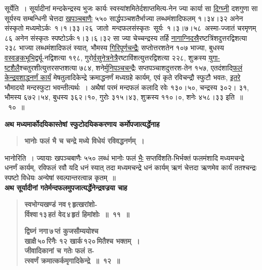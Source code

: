 \documentclass[11pt, openany]{book}
\begin{document}
सूर्येति~। सूर्यादीनां मन्दकेन्द्रस्य भुजः कार्यः स्वस्यांशमितेर्दशाप्तमित्य-नेन ज्या कार्या सा \hyperref[2.9]{दिग्घ्नी} दशगुणा सा सूर्यस्य सम्बन्धिनी चेत्तदा \hyperref[2.9]{खपञ्चबाणैः} ५५० \;सार्द्धपञ्चशतैर्भाज्या \;लब्धमंशादिफलम् \;१।३४।३२ \;अनेन \;संस्कृतो मध्यमोऽर्कः \,१।१।३३।२६ \,जातो \,मन्दफलसंस्कृतः \,सूर्यः \,१।३।७।५८ \,अस्मा-ज्जातं चरमृणम् ८६ अनेन संस्कृतः स्पष्टोऽर्कः\textendash \,१।३।६।३२ सा ज्या चेच्चन्द्रस्य तर्हि \hyperref[2.9]{नागाग्निदस्रै}रष्टत्रिंशदुत्तरद्विशत्या २३८ भाज्या लब्धमंशादिफलं स्यात्, भौमस्य \hyperref[2.9]{गिरिपूर्णचन्द्रैः} सप्तोत्तरशतेन १०७ भाज्या, बुधस्य \hyperref[2.9]{वस्वङ्कभूभि}र्द्व्यू-नद्विशत्या १९८, गुरो\hyperref[2.10]{र्वसुनेत्रनेत्रै}रष्टाविंशत्युत्तरद्विशत्या २२८, शुक्रस्य \hyperref[2.10]{युगा-ष्टशैलै}श्चतुरशीत्युत्तरसप्तशत्या ७८४, शने\hyperref[2.10]{र्मुनिपञ्चचन्द्रैः} सप्तपञ्चाशदुत्तरश-तेन १५७, एतदंशादि\hyperref[2.10]{फलं केन्द्रवशाद्धनर्णं कार्यं} मेषतुलादिकेन्द्रे क्रमाद्धनर्णं मध्यग्रहे कार्यम्, एवं कृते रविचन्द्रौ स्फुटौ भवतः, \hyperref[2.10]{इतरे} भौमादयो मन्दस्फुटा भवन्तीत्यर्थः~। अथैषां परमं मन्दफलं कलादि रवेः १३०।५०, चन्द्रस्य ३०२। ३१, भौमस्य ६७२।५४, बुधस्य ३६२।१०, गुरोः ३१५।४३, शुक्रस्य ११०।०, शनेः ४५८।३३ इति~॥~१०~॥

\newpage

{\small \textbf{अथ मध्यमार्कोदयिकास्तेषां स्फुटोदयिककरणाय कर्मोपजात्यर्द्धेनाह\textendash }}

 \label{2.11}
\begin{quote}
{\large \textbf{{\color{purple}भानोः फलं भै च चन्द्रे मध्ये विधेयं रविवद्धनर्णम्~।}}}
\end{quote}

भानोरिति~। ज्यायाः खपञ्चबाणैः ५५० लब्धं भानोः फलं \hyperref[2.11]{भैः} सप्तविंशति-भिर्भक्तं फलमंशादि मध्यमचन्द्रे धनर्णं कार्यम्, रविफलं रवौ यदि धनं स्यात् तदा \;मध्यमचन्द्रे \;धनं \;कार्यम् \;ऋणं \;चेत्तदा \;ऋणमेव \;कार्यं \;ततश्चन्द्रः \;स्पष्टो विधेयः अन्येषां स्वल्पान्तरत्वान्न कृतम्~॥\\

{\small \textbf{अथ सूर्यादीनां गतेर्मन्दफलमुपजात्यर्द्धेनेन्द्रवज्रया चाह\textendash }}

\begin{quote}
{\large \textbf{{\color{purple}स्वभोग्यखण्डं नव\textendash \,९\textendash \,हृत्खरांशो-\\
र्विश्वा\textendash \,१३\textendash \,हतं वेद\textendash \,४\textendash \,हृतं हिमांशोः~॥~११~॥}}
\vspace{1mm}

 \label{2.12}
\textbf{{\color{purple}द्विघ्नं नगा\textendash \,७\textendash \,प्तं कुजसौम्ययोश्च \\
खाक्षै\textendash \,५०\textendash \,रिनैः १२ खार्क\textendash \,१२०\textendash \,मितैश्च भक्तम्~। \\
जीवादिकानां च गतेः फलं त-\\
त्स्वर्णं क्रमात्कर्कमृगादिकेन्द्रे~॥~१२~॥}}}
\end{quote}
\end{document}
